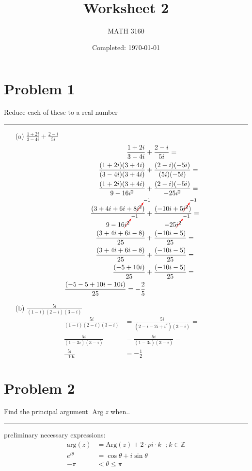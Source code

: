 \documentclass{article}
\title{Worksheet 2}
\author{
  MATH 3160\\
  \myauthor
}
\date{Completed: \today} %
\newcommand{\canceling}[2]{\textcolor{red}{\cancelto{\textcolor{black}{#1}}{\textcolor{black}{#2}}}}
\DeclareMathOperator{\Arg}{Arg}
\begin{document}
\maketitle


\section*{Problem 1}
Reduce each of these to a real number

\hrule
\begin{enumerate}
\item[(a)] $ \frac{1+2i}{3-4i} + \frac{2-i}{5i}$
  \begin{align*}
    \frac{1+2i}{3-4i} &+ \frac{2-i}{5i} = \\
    \frac{(1+2i)(3+4i)}{(3-4i)(3+4i)} &+ \frac{(2-i)(-5i)}{(5i)(-5i)} = \\
    \frac{(1+2i)(3+4i)}{9-16i^2} &+ \frac{(2-i)(-5i)}{-25i^2} = \\
    \frac{(3+4i+6i+8\canceling{-1}{i^2})}{9-16\canceling{-1}{i^2}} &+ \frac{(-10i+5\canceling{-1}{i^2})}{-25\canceling{-1}{i^2}} = \\
    \frac{(3+4i+6i-8)}{25} &+ \frac{(-10i-5)}{25} = \\
    \frac{(3+4i+6i-8)}{25} &+ \frac{(-10i-5)}{25} = \\
    \frac{(-5+10i)}{25} &+ \frac{(-10i-5)}{25} = \\
    \frac{(-5-5+10i -10i)}{25} = -\frac{2}{5}\\
  \end{align*}
\item[(b)] $ \frac{5i}{(1-i)(2-i)(3-i)}$
  \begin{align*}
    \frac{5i}{(1-i)(2-i)(3-i)} &= \frac{5i}{(2-i-2i+i^2)(3-i)} = \\
    \frac{5i}{(1-3i)(3-i)} &= \frac{5i}{(1-3i)(3-i)} =\\
    \frac{5i}{-10i} &= -\frac{1}{2}
  \end{align*}
\end{enumerate}

\newpage
\section*{Problem 2}
Find the principal argument $\Arg z$ when..
\hrule
preliminary necessary expressions:
  \begin{align*}
    \text{arg}(z) &= \text{Arg}(z) + 2\cdot pi\cdot k\ \ \ ;k\in \mathbb{Z} \\
    e^{i\theta} &= \cos\theta + i\sin{\theta}\\
    -\pi & < \theta \le \pi 
  \end{align*}
\end{document}
